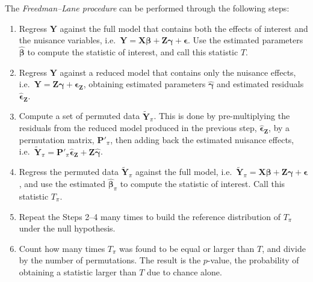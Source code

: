 The \emph{Freedman--Lane procedure} \citep{Freedman1983} can be performed through the following steps:

\begin{enumerate}
\item Regress $\mathbf{Y}$ against the full model that contains both the effects of interest and the nuisance variables, i.e.\ $\mathbf{Y} = \mathbf{X}\boldsymbol{\beta} + \mathbf{Z}\boldsymbol{\gamma} + \boldsymbol{\epsilon}$. Use the estimated parameters $\boldsymbol{\hat{\beta}}$ to compute the statistic of interest, and call this statistic $T$.
\item Regress $\mathbf{Y}$ against a reduced model that contains only the nuisance effects, i.e.\ $\mathbf{Y} = \mathbf{Z}\boldsymbol{\gamma} + \boldsymbol{\epsilon}_{\mathbf{Z}}$, obtaining estimated parameters $\boldsymbol{\hat{\gamma}}$ and estimated residuals $\boldsymbol{\hat{\epsilon}}_{\mathbf{Z}}$.
\item Compute a set of permuted data $\mathbf{\tilde{Y}}_{\pi}$. This is done by pre-multiplying the residuals from the reduced model produced in the previous step, $\boldsymbol{\hat{\epsilon}}_{\mathbf{Z}}$, by a permutation matrix, $\mathbf{P}'_{\pi}$, then adding back the estimated nuisance effects, i.e.\ $\mathbf{\tilde{Y}}_{\pi} = \mathbf{P}'_{\pi}\boldsymbol{\hat{\epsilon}}_{\mathbf{Z}} + \mathbf{Z}\boldsymbol{\hat{\gamma}}$. 
\item Regress the permuted data $\mathbf{\tilde{Y}}_{\pi}$ against the full model, i.e.\ $\mathbf{\tilde{Y}}_{\pi} = \mathbf{X}\boldsymbol{\beta} + \mathbf{Z}\boldsymbol{\gamma} + \boldsymbol{\epsilon}$, and use the estimated $\boldsymbol{\hat{\beta}}_{\pi}$ to compute the statistic of interest. Call this statistic $T_{\pi}$.
\item Repeat the Steps 2--4 many times to build the reference distribution of $T_{\pi}$ under the null hypothesis.
\item Count how many times $T_{\pi}$ was found to be equal or larger than $T$, and divide by the number of permutations. The result is the $p$-value, the probability of obtaining a statistic larger than $T$ due to chance alone.
\end{enumerate}

